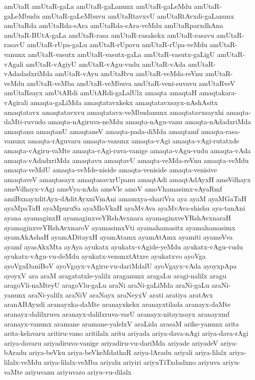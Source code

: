 {amUtaR
amUtaR-gaLa
amUtaR-gaLanunx
amUtaR-gaLeMdu
amUtaR-gaLeMbudu
amUtaR-gaLeMbuvu
amUtaRtavxvU
amUtaRtAvxdi-gaLanunx
amUtaRda
amUtaRda-sAra
amUtaRda-sAra-veMdu
amUtaRparxdhAna
amUtaR-BUtA-gaLa
amUtaR-rasa
amUtaR-rasakekx
amUtaR-rasavu
amUtaR-rasavU
amUtaR-rUpa-gaLu
amUtaR-rUpavu
amUtaR-rUpa-veMdu
amUtaR-vanunx
amUtaR-vasutx
amUtaR-vasutx-gaLa
amUtaR-vasutx-gaLigU
amUtaR-vAgali
amUtaR-vAgiyU
amUtaR-vAgu-vudu
amUtaR-vAda
amUtaR-vAdadadxriMda
amUtaR-vAyu
amUtaRvu
amUtaR-veMda-reVnu
amUtaR-veMdu
amUtaR-veMba
amUtaR-veMbuva
amUtaR-veni-suvavu
amUtaRveV
amUtaRsayx
amUtARdi
amUtARdi-gaLalUlx
amaqta
amaqtaH
amaqtakara-vAgirali
amaqta-gaLiMda
amaqtatavxkekx
amaqtatavxsayx-nAshAsitx
amaqtatavx
amaqtatavxvu
amaqtatavx-veMbudanunx
amaqtatavxsayxhi
amaqta-daMti-ruvudo
amaqta-nAgiruva-neMdu
amaqta-nAgu-vanu
amaqta-nAdadxriMda
amaqtanu
amaqtanU
amaqtaneV
amaqta-pada-diMda
amaqtamf
amaqta-rasa-vanunx
amaqta-rAguvaru
amaqta-vanunx
amaqta-vAgi
amaqta-vAgi-rutatxde
amaqta-vAgiru-vaMte
amaqta-vAgi-ruva-vanige
amaqta-vAgu-vudu
amaqta-vAda
amaqta-vAdadxriMda
amaqtavu
amaqtavU
amaqta-veMda-reVnu
amaqta-veMdu
amaqta-veMdU
amaqta-veMde-niside
amaqta-veniside
amaqta-venisive
amaqtaveV
amaqtasayx
amaqtasavxrUpanu
amaqtAdi
amaqtAdAyxH
ameVdhayx
ameVdhayx-vAgi
ameVya-nAda
ameVle
amoV
amoVhamasimx-sAyaRmf
amiBxnayxditAyx-dAditAyxniVmAni
amamxya-shariVra
aya
ayaM
ayaMGaTaH
ayaMpaTaH
ayaMpuruSa
ayaMloVkaH
ayaMvAva
ayaMvAva-shishu
aya-tanAni
ayana
ayamaginxH
ayamaginxveYRshAvxnara
ayamaginxveYRshAvxnaraH
ayamaginxveYRshAvxnaroV
ayamasimxVti
ayamahamasitx
ayamahamasimx
ayamAkAshaH
ayamADitayxH
ayamAtamx
ayamAtAmx
ayamiti
ayameVva
ayamf
ayasAkxMta
ayAya
ayukatx
ayukatx-vAgide-yeMdu
ayukatx-vAgu-vudu
ayukatx-vAgu-vu-deMdu
ayukatx-venunxtAtxre
ayukatxvo
ayoVga
ayoVguDaniBoV
ayoVgayx-vAgiru-vu-dariMdalU
ayoVgayx-vAda
ayoyxpApa
ayoyxV
ara
araM
aragatatxle-yalilx
araganunx
aragaLu
aragi-nalilx
aragu
aragoVli-naMteyU
aragoVlu-gaLu
araNi
araNi-gaLiMda
araNi-gaLu
araNi-yanunx
araNi-yalilx
araNiV
araNayx
araNeyxV
arati
aratiya
aratAvx
aranABAyxdi
aranayxka-daMte
aranayxkekx
aranayxtilada
aranayx-daMte
aranayx-dalilxruva
aranayx-dalilxruva-varU
aranayx-nitayxsayx
aranayxmf
aranayx-vanunx
aramane
aramane-yalelxV
araLida
arasaM
arike-yanunx
arita
arita-kelavaru
aritiru-vano
aritilalx
aritu
ariyada
ariya-dava-nAgi
ariya-dava-rAgi
ariya-davaru
ariyadiruva-vanige
ariyadiru-vu-dariMda
ariyade
ariyadeV
ariya-bAradu
ariya-beVku
ariya-beVkeMdathaR
ariya-lAradu
ariyali
ariya-lilalx
ariya-lilalx-veMdu
ariya-lilalx-veMba
ariyalu
ariyiri
ariyuTiTxdadxno
ariyuva
ariyu-vaMte
ariyuvanu
ariyuvaro
ariyu-vu-dilalx
}
